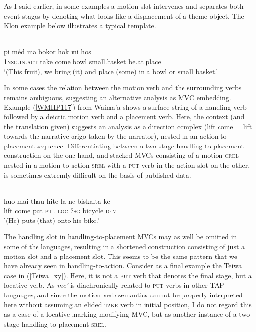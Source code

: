 As I said earlier, in some examples a motion slot intervenes and separates both event stages by denoting what looks like a displacement of a theme object. The Klon example below illustrates a typical template.

\ea 
{}\\
\gll pi méd ma bokor hok mi hos \\
\textsc{1}\textsc{nsg}.\textsc{in}.\textsc{act} take come bowl small.basket be.at place \\
\glft `(This fruit), we bring (it) and place (some) in a bowl or small basket.'\\ 
\z

In some cases the relation between the motion verb and the surrounding verbs remains ambiguous, suggesting an alternative analysis as MVC embedding. Example (\ref{WMHP117}) from Waima'a shows a surface string of a handling verb followed by a deictic motion verb and a placement verb. Here, the context (and the translation given) suggests an analysis as a direction complex  (lift come = lift towards the narrative origo taken by the narrator), nested in an action-to-placement sequence. Differentiating between a two-stage handling-to-placement construction on the one hand, and stacked MVCs consisting of a motion \textsc{crel} nested in a motion-to-action \textsc{srel} with a \textsc{put} verb in the action slot on the other, is sometimes extremly difficult on the basis of published data.

\ea \label{WMHP117}
\\
\gll huo mai thau hite la ne biskalta ke \\
lift come put \textsc{ptl} \textsc{loc} \textsc{3}\textsc{sg} bicycle \textsc{dem} \\
\glft '(He) puts (that) onto his bike.'\\ 
\z

The handling slot in handling-to-placement MVCs may as well be omitted in some of the languages, resulting in a shortened construction consisting of just a motion slot and a placement slot. This seems to be the same pattern that we have already seen in handling-to-action. Consider as a final example the Teiwa case in (\ref{Teiwa_xy}). Here, it is not a \textsc{put} verb that denotes the final stage, but a locative verb. As \textit{me'} is diachronically related to \textsc{put} verbs in other TAP languages, and since the motion verb semantics cannot be properly interpreted here without assuming an elided \textsc{take} verb in initial position, I do not regard this as a case of a locative-marking modifying MVC, but as another instance of a two-stage handling-to-placement \textsc{srel}.

